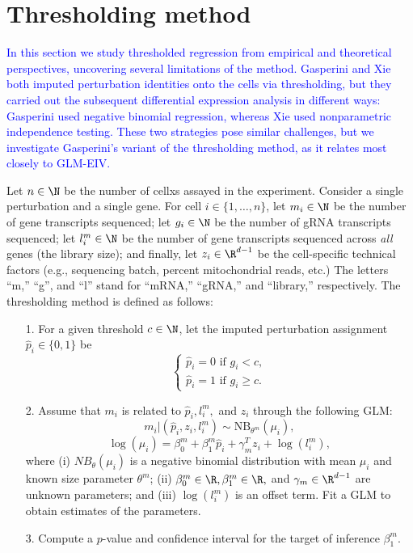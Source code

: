 \documentclass[12pt]{article}
\newcommand{\blue}[1]{\textcolor{blue}{#1}}
\begin{document}
\section{Thresholding method}
\blue{In this section we study thresholded regression from empirical and theoretical perspectives, uncovering several limitations of the method. Gasperini and Xie both imputed perturbation identities onto the cells via thresholding, but they carried out the subsequent differential expression analysis in different ways: Gasperini used negative binomial regression, whereas Xie used nonparametric independence testing. These two strategies pose similar challenges, but we investigate Gasperini's variant of the thresholding method, as it relates most closely to GLM-EIV.}

Let $n \in \N$ be the number of cellxs assayed in the experiment. Consider a single perturbation and a single gene. For cell $i \in \{1, \dots, n\}$, let $m_i \in \N$ be the number of gene transcripts sequenced; let $g_i \in \N$ be the number of gRNA transcripts sequenced; let $l^m_i \in \N$ be the number of gene transcripts sequenced across \textit{all} genes (the library size); and finally, let $z_i \in \R^{d-1}$ be the cell-specific technical factors (e.g., sequencing batch, percent mitochondrial reads, etc.) The letters ``m,'' ``g'', and ``l'' stand for ``mRNA,'' ``gRNA,'' and ``library,'' respectively. The thresholding method is defined as follows:
\begin{itemize}
\item[1.] For a given threshold $c \in \N$, let the imputed perturbation assignment $\hat{p}_i \in \{0, 1\}$ be $$\begin{cases} \hat{p}_i = 0 \textrm{ if } g_i < c, \\ \hat{p}_i = 1 \textrm{ if } g_i \geq c. \end{cases}$$
\item[2.] Assume that $m_i$ is related to $\hat{p}_i, l^m_i,$ and $z_i$ through the following GLM:
$$m_i | (\hat{p}_i, z_i, l^m_i) \sim \textrm{NB}_{\theta^m}(\mu_i),$$
\begin{equation}\label{thresh_glm}
\log(\mu_i) = \beta^m_0 + \beta^m_1 \hat{p}_i + \gamma^T_m z_i + \log\left( l_i^m\right),
\end{equation}
where (i) $NB_\theta(\mu_i)$ is a negative binomial distribution with mean $\mu_i$ and known size parameter $\theta^m$; (ii) $\beta^m_0 \in \R, \beta^m_1 \in \R,$ and $\gamma_m \in  \R^{d-1}$ are unknown parameters; and (iii) $\log(l_i^m)$ is an offset term. Fit a GLM to obtain estimates of the parameters.

\item[3.] Compute a $p$-value and confidence interval for the target of inference $\beta^m_1$.
\end{itemize}
\end{document}
